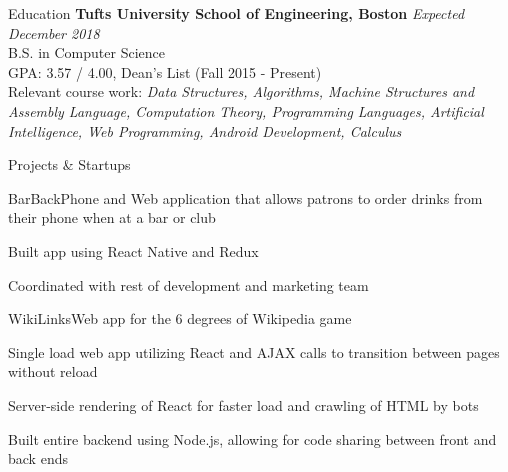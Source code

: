\documentclass{resume}
\begin{document}
  \begin{rSection}{Education}
    {\bf Tufts University School of Engineering, Boston} \hfill {\em Expected December 2018} \\ 
    { B.S. in Computer Science} \\
    GPA: 3.57 / 4.00, Dean's List (Fall 2015 - Present)\\
    Relevant course work: \textit{Data Structures, Algorithms, Machine Structures and Assembly Language, Computation Theory, Programming Languages, Artificial Intelligence, Web Programming, Android Development, Calculus}
  \end{rSection}
  
  \begin{rSection}{Projects \& Startups}
  
    \begin{rSubsection}{BarBack}{}{\normalfont Phone and Web application that allows patrons to order drinks from their phone when at a bar or club}{}
    \item Built app using React Native and Redux
    \item Coordinated with rest of development and marketing team 
  \end{rSubsection}
  
  \begin{rSubsection}{WikiLinks}{}{\normalfont Web app for the 6 degrees of Wikipedia game}{}
  \item Single load web app utilizing React and AJAX calls to transition between pages without reload
  \item Server-side rendering of React for faster load and crawling of HTML by bots
  \item Built entire backend using Node.js, allowing for code sharing between front and back ends
  \end{rSubsection}
   
  \end{rSection}
  
\end{document}
